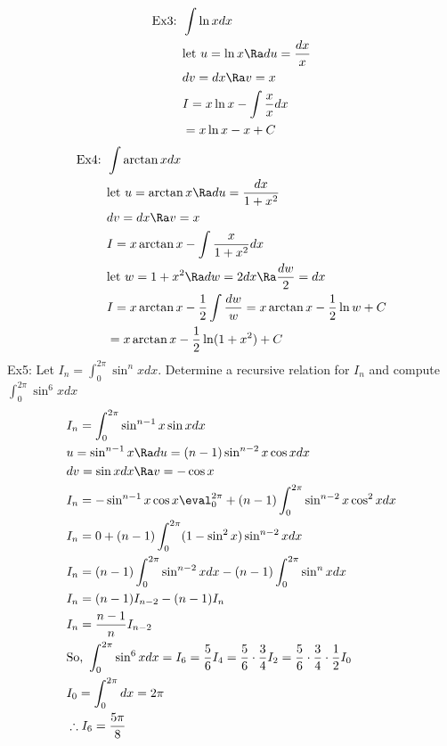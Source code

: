 \begin{align*}
    \text{Ex3: }&\int \ln xdx\\
    &\text{let }u=\ln x\Ra du=\frac{dx}{x}\\
    &dv=dx\Ra v=x\\
    &I=x\ln x-\int \frac{x}{x}dx\\
    &=x\ln x-x+C
\end{align*}
\begin{align*}
    \text{Ex4: }&\int \arctan xdx\\
    &\text{let }u=\arctan x\Ra du=\frac{dx}{1+x^2}\\
    &dv=dx\Ra v=x\\
    &I=x\arctan x-\int\frac{x}{1+x^2}dx\\
    &\text{let }w=1+x^2\Ra dw=2dx\Ra \frac{dw}{2}=dx\\
    &I=x\arctan x-\frac{1}{2}\int\frac{dw}{w}=x\arctan x-\frac{1}{2}\ln w+C\\
    &=x\arctan x-\frac{1}{2}\ln(1+x^2)+C
\end{align*}
Ex5: Let $I_n=\int_0^{2\pi}\sin^n xdx$. Determine a recursive relation for $I_n$ and compute $\int_0^{2\pi}\sin^6xdx$
\begin{align*}
    &I_n=\int_0^{2\pi}\sin^{n-1}x\sin xdx\\
    &u=\sin^{n-1}x\Ra du=(n-1)\sin^{n-2}x\cos x dx\\
    &dv=\sin xdx\Ra v=-\cos x\\
    &I_n={-\sin^{n-1}x\cos x}\eval_0^{2\pi}+(n-1)\int_0^{2\pi}\sin^{n-2}x\cos^2xdx\\
    &I_n=0+(n-1)\int_0^{2\pi}(1-\sin^2x)\sin^{n-2}xdx\\
    &I_n=(n-1)\int_0^{2\pi}\sin^{n-2}xdx-(n-1)\int_0^{2\pi}\sin^nxdx\\
    &I_n=(n-1)I_{n-2}-(n-1)I_n\\
    &I_n=\frac{n-1}{n}I_{n-2}\\
    &\text{So, }\int_0^{2\pi}\sin^6xdx=I_6=\frac{5}{6}I_4=\frac{5}{6}\cdot\frac{3}{4}I_2=\frac{5}{6}\cdot \frac{3}{4}\cdot\frac{1}{2}I_0\\
    &I_0=\int_0^{2\pi}dx=2\pi\\
    &\therefore I_6=\frac{5\pi}{8}
\end{align*}

